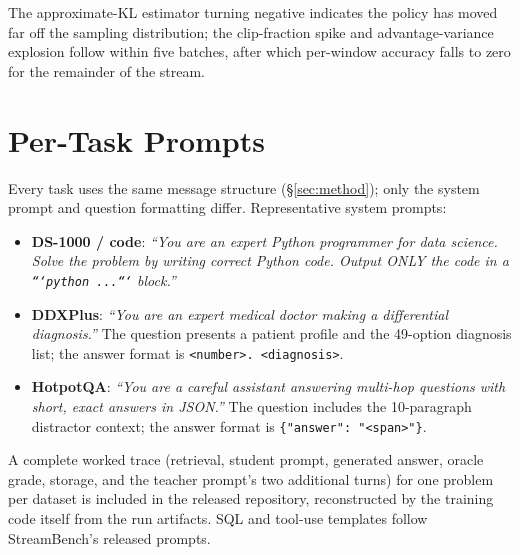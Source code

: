 The approximate-KL estimator turning negative indicates the policy has moved far
off the sampling distribution; the clip-fraction spike and advantage-variance
explosion follow within five batches, after which per-window accuracy falls to
zero for the remainder of the stream.

\section{Per-Task Prompts}
\label{app:prompts}
Every task uses the same message structure (\S\ref{sec:method}); only the
system prompt and question formatting differ. Representative system prompts:

\begin{itemize}
\item \textbf{DS-1000 / code}: \emph{``You are an expert Python programmer for
data science. Solve the problem by writing correct Python code. Output ONLY the
code in a \texttt{```python ...```} block.''}
\item \textbf{DDXPlus}: \emph{``You are an expert medical doctor making a
differential diagnosis.''} The question presents a patient profile and the
49-option diagnosis list; the answer format is \texttt{<number>. <diagnosis>}.
\item \textbf{HotpotQA}: \emph{``You are a careful assistant answering
multi-hop questions with short, exact answers in JSON.''} The question includes
the 10-paragraph distractor context; the answer format is
\texttt{\{"answer": "<span>"\}}.
\end{itemize}

A complete worked trace (retrieval, student prompt, generated answer, oracle
grade, storage, and the teacher prompt's two additional turns) for one problem
per dataset is included in the released repository, reconstructed by the
training code itself from the run artifacts. SQL and tool-use templates follow
StreamBench's released prompts.

